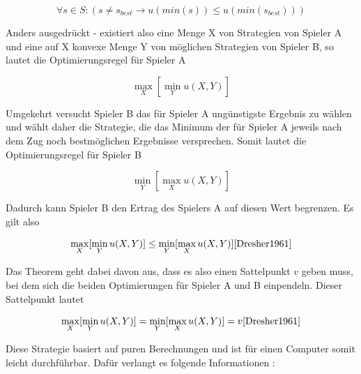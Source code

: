 \begin{equation}
\forall s \in S : (s \neq s_{best} \rightarrow u(min(s)) \leq u(min(s_{best})))
\end{equation}

Anders ausgedrückt - existiert also eine Menge X von Strategien von Spieler A und eine auf X konvexe Menge Y von möglichen Strategien von Spieler B, so lautet die Optimierungsregel für Spieler A

\begin{equation}
\max\limits_X[\min\limits_Yu(X,Y)]
\end{equation}

Umgekehrt versucht Spieler B das für Spieler A ungünstigste Ergebnis zu wählen und wählt daher die Strategie, die das Minimum der für Spieler A jeweils nach dem Zug noch bestmöglichen Ergebnisse versprechen. Somit lautet die Optimierungsregel für Spieler B

\begin{equation}
\min\limits_Y[\max\limits_Xu(X,Y)]
\end{equation}


Dadurch kann Spieler B den Ertrag des Spielers A auf diesen Wert begrenzen. Es gilt also

\begin{equation}
\max\limits_X[\min\limits_Yu(X,Y)] \leq \min\limits_Y[\max\limits_Xu(X,Y)] \cite{Dresher1961}
\end{equation}

Das Theorem geht dabei davon aus, dass es also einen Sattelpunkt $v$ geben muss, bei dem sich die beiden Optimierungen für Spieler A und B einpendeln. Dieser Sattelpunkt lautet

\begin{equation}
\max\limits_X[\min\limits_Yu(X,Y)] = \min\limits_Y[\max\limits_Xu(X,Y)] = v \cite{Dresher1961}
\end{equation}

Diese Strategie basiert auf puren Berechnungen und ist für einen Computer somit leicht durchführbar. Dafür verlangt es folgende Informationen \cite{Stroetmann2018}:

